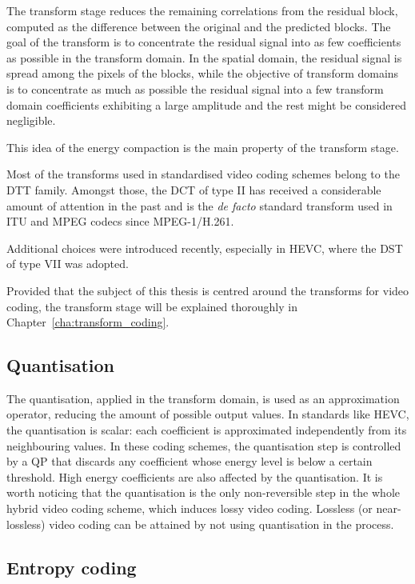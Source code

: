 \documentclass[11pt,a4paper,openright,twoside]{book}
\numberwithin{equation}{section} %
\numberwithin{figure}{section} %
\numberwithin{table}{section} %
\begin{document}
The transform stage reduces the remaining correlations from the residual
block, computed as the difference between the original and the predicted
blocks.
The goal of the transform is to concentrate the residual signal into as few
coefficients as possible in the transform domain.
In the spatial domain, the residual signal is spread among the pixels of the
blocks, while the objective of transform domains is to concentrate as much as
possible the residual signal into a few transform domain coefficients
exhibiting a large amplitude and the rest might be considered negligible.

This idea of the energy compaction is the main property of the transform
stage.

Most of the transforms used in standardised video coding schemes belong to the
\ac{DTT} family.
Amongst those, the \ac{DCT} of type II has received a considerable amount of
attention in the past and is the \emph{de facto} standard transform used in
\acs{ITU} and \acs{MPEG} codecs since \acs{MPEG}-1/H.261.

Additional choices were introduced recently, especially in \ac{HEVC}, where
the \ac{DST} of type VII was adopted.

Provided that the subject of this thesis is centred around the
transforms for video coding, the transform stage will be explained
thoroughly in Chapter~\ref{cha:transform_coding}.

\subsection{Quantisation}
\label{sub:quantisation}

The quantisation, applied in the transform domain, is used as an approximation
operator, reducing the amount of possible output values.
In standards like \ac{HEVC}, the quantisation is scalar:
each coefficient is approximated independently from its neighbouring values.
In these coding schemes, the quantisation step is controlled by a \ac{QP} that
discards any coefficient whose energy level is below a certain threshold.
High energy coefficients are also affected by the quantisation.
It is worth noticing that the quantisation is the only non-reversible step in
the whole hybrid video coding scheme, which induces lossy video coding.
Lossless (or near-lossless) video coding can be attained by not using
quantisation in the process.

\subsection{Entropy coding}
\label{sub:entropy_coding}
\end{document}
